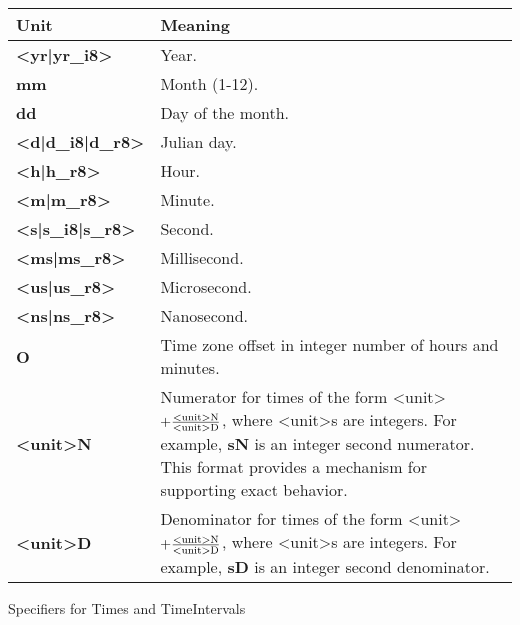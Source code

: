 
\begin{center}
\begin{tabular}{|p{1in}|p{3.5in}|}
\hline
Unit & Meaning \\
\hline\hline
{\bf <yr|yr\_i8>} & Year. \\
\hline
{\bf mm} & Month (1-12). \\
\hline
{\bf dd} & Day of the month. \\
\hline
{\bf <d|d\_i8|d\_r8>} & Julian day. \\
\hline
{\bf <h|h\_r8>} & Hour. \\
\hline
{\bf <m|m\_r8>} & Minute. \\
\hline
{\bf <s|s\_i8|s\_r8>} & Second. \\
\hline
{\bf <ms|ms\_r8>} & Millisecond. \\
\hline
{\bf <us|us\_r8>} & Microsecond. \\
\hline
{\bf <ns|ns\_r8>} & Nanosecond. \\
\hline
{\bf O} & Time zone offset in integer number of hours and minutes. \\
\hline
{\bf <unit>N} & Numerator for times of the form <unit> {\bf $ + 
\frac{{\rm <unit>N}}{{\rm <unit>D}}$}, where <unit>s are integers. For example, 
{\bf sN} is an integer second numerator.  This format provides 
a mechanism for supporting exact behavior. \\
\hline
{\bf <unit>D} & Denominator for times of the form <unit> {\bf $ + 
\frac{{\rm <unit>N}}{{\rm <unit>D}}$}, where <unit>s are integers. For example, 
{\bf sD} is an integer second denominator.
\\
\hline
\end{tabular}
\begin{table}
\caption{\label{table:timeOpts}Specifiers for Times and TimeIntervals}
\end{table}
\end{center}






